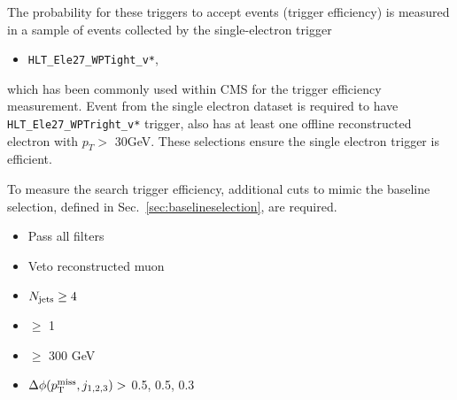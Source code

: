The probability for these triggers to accept events (trigger efficiency) is measured in a sample of events collected by the single-electron trigger
\begin{itemize}
  \item \texttt{HLT\_Ele27\_WPTight\_v*},
\end{itemize}
which has been commonly used within CMS for the \MET trigger efficiency measurement. Event from the single electron dataset is required to have \texttt{HLT\_Ele27\_WPTright\_v*} trigger, also has at least one offline reconstructed electron with $p_{T}>$ 30GeV. These selections ensure the single electron trigger is efficient. 

To measure the search trigger efficiency, additional cuts to mimic the baseline selection, defined in Sec.~\ref{sec:baselineselection}, are required.
\begin{itemize}
  \item Pass all filters
  \item Veto reconstructed muon
  \item $N_{\text{jets}}\geq4$
  \item \nbjets $\ge$ 1
  \item \HT $\ge$ 300 GeV
  \item $\Delta\phi(p^{\rm miss}_{\rm T}, j_{1,2,3})>$ 0.5, 0.5, 0.3
\end{itemize}

